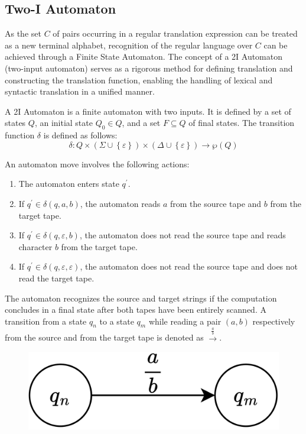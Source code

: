 \subsection{Two-I Automaton}
As the set $C$ of pairs occurring in a regular translation expression can be treated as a new terminal alphabet, recognition of the regular language over $C$ can be achieved through a Finite State Automaton.
The concept of a 2I Automaton (two-input automaton) serves as a rigorous method for defining translation and constructing the translation function, enabling the handling of lexical and syntactic translation in a unified manner.
\begin{definition}[2I Automaton]
    A 2I Automaton is a finite automaton with two inputs.
    It is defined by a set of states $Q$, an initial state $Q_0 \in Q$, and a set $F \subseteq Q$ of final states. 
    The transition function $\delta$ is defined as follows:
    \[ \delta : Q \times \left( \Sigma \cup \left\{ \varepsilon \right\} \right) \times \left( \Delta \cup \left\{ \varepsilon \right\} \right) \rightarrow \wp (Q) \]
\end{definition}
An automaton move involves the following actions:
\begin{enumerate}
    \item The automaton enters state $q^{\prime}$.
    \item If $q^{\prime} \in \delta(q, a, b)$, the automaton reads $a$ from the source tape and $b$ from the target tape. 
    \item If $q^{\prime} \in \delta(q, \varepsilon, b)$, the automaton does not read the source tape and reads character $b$ from the target tape. 
    \item If $q^{\prime} \in \delta(q, \varepsilon,\varepsilon)$, the automaton does not read the source tape and does not read the target tape. 
\end{enumerate}
The automaton recognizes the source and target strings if the computation concludes in a final state after both tapes have been entirely scanned. 
A transition from a state $q_n$ to a state $q_m$ while reading a pair $\left( a, b \right)$ respectively from the source and from the target tape is denoted as $\xrightarrow{\frac{a}{b}}$.
\begin{figure}[H]
  \centering
  \includegraphics[width=0.25\linewidth]{images/2i.png}
\end{figure}


